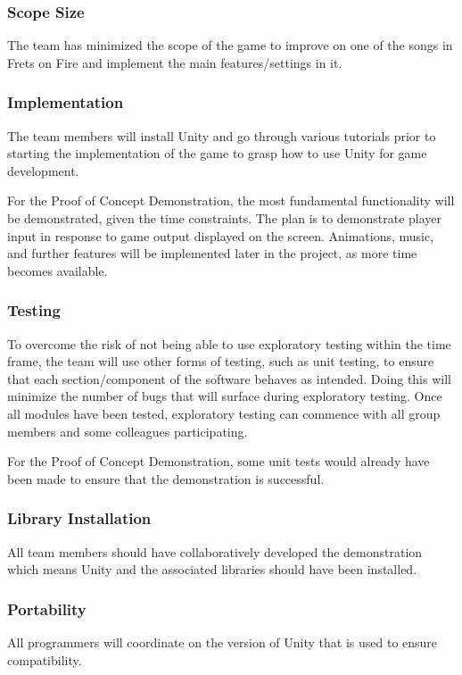 \documentclass[12pt,letterpaper]{article}
\begin{document}
\subsubsection{Scope Size}
The team has minimized the scope of the game to improve on one of the songs in Frets on Fire and implement the main features/settings in it.

\subsubsection{Implementation}
The team members will install Unity and go through various tutorials prior to starting the implementation of the game to grasp how to use Unity for game development. 

For the Proof of Concept Demonstration, the most fundamental functionality will be demonstrated, given the time constraints. The plan is to demonstrate player input in response to game output displayed on the screen. Animations, music, and further features will be implemented later in the project, as more time becomes available.

\subsubsection{Testing}
To overcome the risk of not being able to use exploratory testing within the time frame, the team will use other forms of testing, such as unit testing, to ensure that each section/component of the software behaves as intended. Doing this will minimize the number of bugs that will surface during exploratory testing. Once all modules have been tested, exploratory testing can commence with all group members and some colleagues participating.

For the Proof of Concept Demonstration, some unit tests would already have been made to ensure that the demonstration is successful. 

\subsubsection{Library Installation}
All team members should have collaboratively developed the demonstration which means Unity and the associated libraries should have been installed.

\subsubsection{Portability}
All programmers will coordinate on the version of Unity that is used to ensure compatibility.
 
\end{document}
